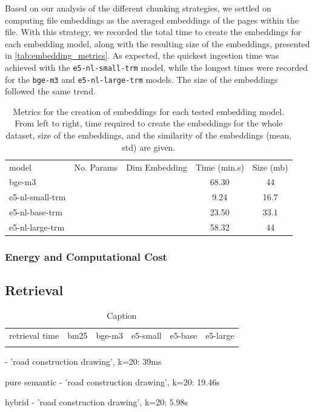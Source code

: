 Based on our analysis of the different chunking strategies, we settled on computing file embeddings as the averaged embeddings of the pages within the file.
With this strategy, we recorded the total time to create the embeddings for each embedding model, along with the resulting size of the embeddings, presented in \autoref{tab:embedding_metrics}.
As expected, the quickest ingestion time was achieved with the \texttt{e5-nl-small-trm} model, while the longest times were recorded for the \texttt{bge-m3} and \texttt{e5-nl-large-trm} models.
The size of the embeddings followed the same trend.

\begin{table}[h!]
    \centering
    \begin{tabular}{l|c |c | c| c}
        model & No. Params & Dim Embedding & Time (min.s) & Size (mb) \\
        bge-m3 & & & 68.30 & 44\\
        e5-nl-small-trm & & & 9.24 & 16.7\\
        e5-nl-base-trm & & & 23.50 & 33.1 \\
        e5-nl-large-trm & & & 58.32 & 44 \\
    \end{tabular}
    \caption{Metrics for the creation of embeddings for each tested embedding model. From left to right, time required to create the embeddings for the whole dataset, size of the embeddings, and the similarity of the embeddings (mean, std) are given.}
    \label{tab:embeddings_metrics}
\end{table}


\subsubsection{Energy and Computational Cost}

\subsection{Retrieval}



\begin{table}[h!]
    \centering
    \begin{tabular}{c|c}
        retrieval time & bm25 & bge-m3  & e5-small & e5-base & e5-large\\
         & 
    \end{tabular}
    \caption{Caption}
    \label{tab:placeholder}
\end{table}

- 'road construction drawing', k=20: 39ms

pure semantic
- 'road construction drawing', k=20: 19.46s


hybrid
- 'road construction drawing', k=20: 5.98s